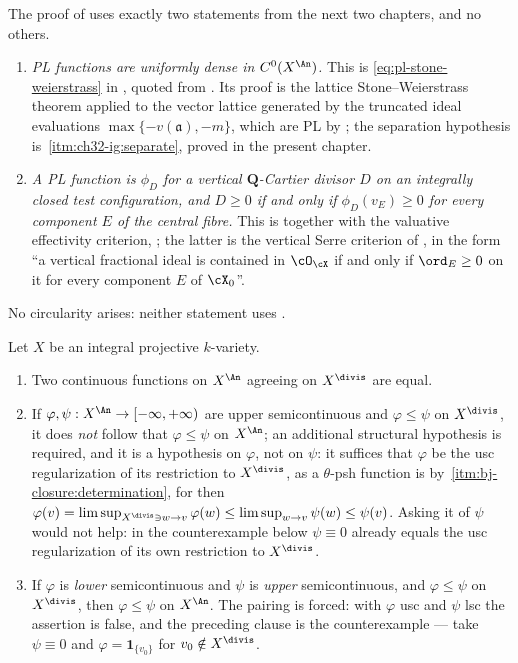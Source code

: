 \begin{remark}
\label{rem:ch32-density-ingredients}
The proof of  uses exactly two statements
from the next two chapters, and no others.
\begin{enumerate}
\item\emph{PL functions are uniformly dense in $C^0(X^{\An})$.}
This is \eqref{eq:pl-stone-weierstrass} in , quoted
from \cite[Theorem~2.2]{BJ22}.  Its proof is the lattice Stone--Weierstrass
theorem applied to the vector lattice generated by the truncated ideal evaluations
$\max\{-v(\mathfrak a),-m\}$, which are PL by
; the separation hypothesis is
\,\cref{itm:ch32-ig:separate}, proved in the
present chapter.
\item\emph{A PL function is $\phi_D$ for a vertical
$\mathbf Q$-Cartier divisor $D$ on an integrally closed test
configuration, and $D\geq0$ if and only if $\phi_D(v_E)\geq0$ for every
component $E$ of the central fibre.}
This is  together with the valuative
effectivity criterion, \cite[Theorem~2.7 and Lemma~2.8]{BJ22}; the latter is
the vertical Serre criterion of , in the form
``a vertical fractional ideal is contained in $\cO_{\cX}$ if and only if
$\ord_E\geq0$ on it for every component $E$ of $\cX_0$''.
\end{enumerate}
No circularity arises: neither statement uses
.
\end{remark}

\begin{corollary}
\label{cor:ch32-determination-divisorial}
Let $X$ be an integral projective $k$-variety.
\begin{enumerate}
\item\label{itm:ch32-dd:cont}
Two continuous functions on $X^{\An}$ agreeing on $X^{\divis}$ are
equal.
\item\label{itm:ch32-dd:usc}
If $\varphi,\psi:X^{\An}\to[-\infty,+\infty)$ are upper semicontinuous
and $\varphi\leq\psi$ on $X^{\divis}$, it does \emph{not} follow that
$\varphi\leq\psi$ on $X^{\An}$; an additional structural hypothesis is
required, and it is a hypothesis on $\varphi$, not on $\psi$: it suffices
that $\varphi$ be the usc regularization of its restriction to
$X^{\divis}$, as a $\theta$-psh function is by
\,\cref{itm:bj-closure:determination}, for then
$\varphi(v)=\limsup_{X^{\divis}\ni w\to v}\varphi(w)
\leq\limsup_{w\to v}\psi(w)\leq\psi(v)$.  Asking it of $\psi$ would not
help: in the counterexample below $\psi\equiv0$ already equals the usc
regularization of its own restriction to $X^{\divis}$.
\item\label{itm:ch32-dd:sup}
If $\varphi$ is \emph{lower} semicontinuous and $\psi$ is \emph{upper}
semicontinuous, and $\varphi\leq\psi$ on $X^{\divis}$, then
$\varphi\leq\psi$ on $X^{\An}$.  The pairing is forced: with $\varphi$
usc and $\psi$ lsc the assertion is false, and the preceding clause is the
counterexample --- take $\psi\equiv0$ and
$\varphi=\mathbf 1_{\{v_0\}}$ for $v_0\notin X^{\divis}$.
\end{enumerate}
\end{corollary}

